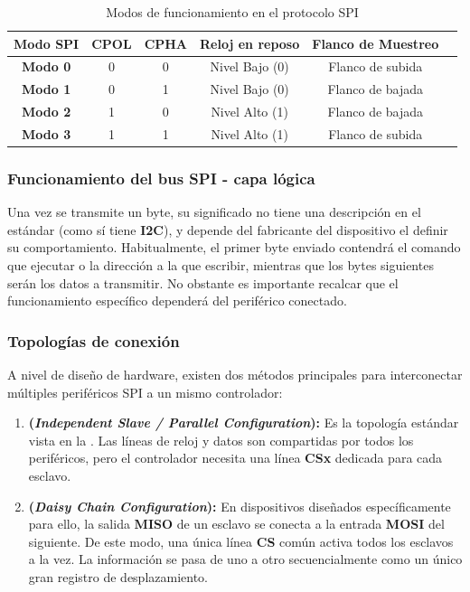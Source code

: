 \documentclass[../main.tex]{subfiles}
\begin{document}
            \begin{table}[h!]
                \centering
                \small
                \sffamily
                \begin{tabular}{cccccc}
                    \hline
                    \textbf{Modo SPI} & \textbf{CPOL} & \textbf{CPHA} & \textbf{Reloj en reposo} & \textbf{Flanco de Muestreo} \\ \hline
                    \textbf{Modo 0} & 0 & 0 & Nivel Bajo (0) & Flanco de subida \\
                    \textbf{Modo 1} & 0 & 1 & Nivel Bajo (0) & Flanco de bajada \\
                    \textbf{Modo 2} & 1 & 0 & Nivel Alto (1) & Flanco de bajada \\
                    \textbf{Modo 3} & 1 & 1 & Nivel Alto (1) & Flanco de subida \\ \hline
                \end{tabular}
                \caption{Modos de funcionamiento en el protocolo SPI}
                \label{tab:spi_modes}
            \end{table}

        \subsubsection{Funcionamiento del bus SPI - capa lógica}

            Una vez se transmite un byte, su significado no tiene una descripción en el estándar (como sí tiene \textbf{I2C}), y depende del fabricante del dispositivo el definir su comportamiento. Habitualmente, el primer byte enviado contendrá el comando que ejecutar o la dirección a la que escribir, mientras que los bytes siguientes serán los datos a transmitir. No obstante es importante recalcar que el funcionamiento específico dependerá del periférico conectado.

        \subsubsection{Topologías de conexión}

            A nivel de diseño de hardware, existen dos métodos principales para interconectar múltiples periféricos SPI a un mismo controlador:

            \begin{enumerate}
                \item \textbf{(\emph{Independent Slave / Parallel Configuration}):} Es la topología estándar vista en la . Las líneas de reloj y datos son compartidas por todos los periféricos, pero el controlador necesita una línea \textbf{CSx} dedicada para cada esclavo.
                \item \textbf{(\emph{Daisy Chain Configuration}):} En dispositivos diseñados específicamente para ello, la salida \textbf{MISO} de un esclavo se conecta a la entrada \textbf{MOSI} del siguiente. De este modo, una única línea \textbf{CS} común activa todos los esclavos a la vez. La información se pasa de uno a otro secuencialmente como un único gran registro de desplazamiento.
            \end{enumerate}
\end{document}
